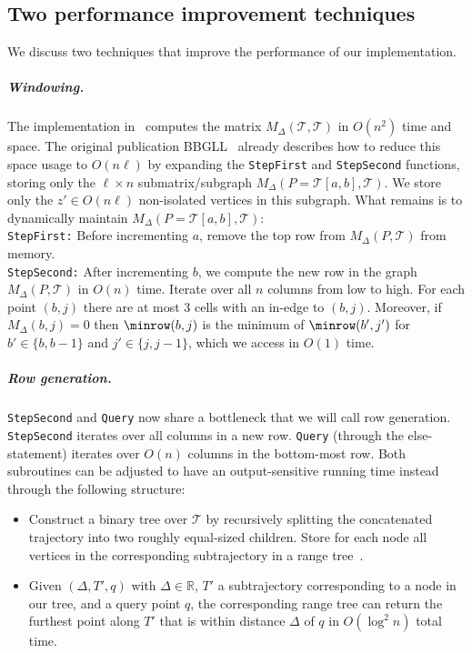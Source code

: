 \documentclass[english, thm-restate]{lipics-v2021}
\begin{document}
\subsection{Two performance improvement techniques}
\label{sub:improvement}

We discuss two techniques that improve the performance of our implementation. 

\subparagraph{Windowing. }
The implementation in~\cite{movetk} computes the matrix $M_\Delta(\mathcal{T}, \mathcal{T})$ in $O(n^2)$ time and space. 
The original publication BBGLL~\cite{buchin2011detecting} already describes how to reduce this space usage to $O(n \ell)$ by expanding the \texttt{StepFirst} and \texttt{StepSecond} functions, storing only the $\ell \times n$ submatrix/subgraph $M_\Delta(P = \mathcal{T}[a, b], \mathcal{T})$. 
We store only the $z' \in O(n \ell)$ non-isolated vertices in this subgraph. What remains is to dynamically maintain  $M_\Delta(P = \mathcal{T}[a, b], \mathcal{T})$: \\

\texttt{StepFirst:}
Before incrementing $a$, remove the top row from $M_\Delta(P, \mathcal{T})$ from memory. \\ 

\texttt{StepSecond:}
After incrementing $b$, we compute the new row in the graph $M_\Delta(P, \mathcal{T})$ in $O(n)$ time. 
Iterate over all $n$ columns from low to high.  For each point $(b, j)$ there are at most $3$ cells with an in-edge to $(b, j)$. Moreover, if $M_\Delta(b, j) = 0$ then $\minrow(b, j)$ is the minimum of  $\minrow(b', j')$ for $b' \in \{b, b-1 \}$ and $j' \in \{j, j-1 \}$, which we access in $O(1)$ time. 




    \subparagraph{Row generation.}
    \texttt{StepSecond} and \texttt{Query} now share a bottleneck that we will call row generation. 
    \texttt{StepSecond} iterates over all columns in a new row. 
    \texttt{Query} (through the else-statement) iterates over $O(n)$ columns in the bottom-most row. Both subroutines can be adjusted to have an output-sensitive running time instead through the following structure:

\begin{itemize}
    \item    Construct a binary tree over $\mathcal{T}$ by recursively {splitting} the concatenated trajectory into two roughly equal-sized children. 
    Store for each node all vertices in the corresponding subtrajectory in a range tree~\cite{DBLP:books/lib/BergCKO08}. 
    \item     Given $(\Delta, T', q)$ with $\Delta \in \mathbb{R}$, $T'$ a subtrajectory corresponding to a node in our tree, and a query point $q$, the corresponding range tree can return the furthest point along $T'$ that is within distance $\Delta$ of $q$ in $O(\log^2 n)$ total time. 
\end{itemize}
 
\end{document}
